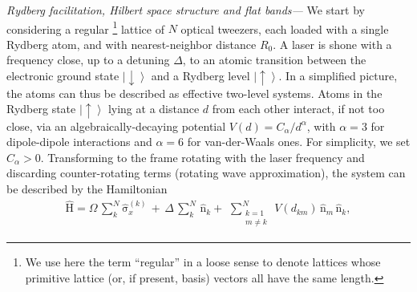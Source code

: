 \documentclass[prl,aps,twocolumn,showpacs,superscriptaddress,longbibliography]{revtex4-1}
\newcommand{\ran}{\right\rangle}
\newcommand{\ket}[1]{\left| #1 \ran}
\newcommand{\up}{\uparrow}
\newcommand{\down}{\downarrow}
\newcommand{\op}[1]{\mathrm{\hat{#1}}}
\begin{document}
\emph{Rydberg facilitation, Hilbert space structure and flat bands---} We start by considering a regular \footnote{We use here the term ``regular'' in a loose sense to denote lattices whose primitive lattice (or, if present, basis) vectors all have the same length.} lattice of $N$ optical tweezers, each loaded with a single Rydberg atom, and with nearest-neighbor distance $R_0$. A laser is shone with a frequency close, up to a detuning $\Delta$, to an atomic transition between the electronic ground state $\ket{\down}$ and a Rydberg level $\ket{\up}$. In a simplified picture, the atoms can thus be described as effective two-level systems. Atoms in the Rydberg state $\ket{\up}$ lying at a distance $d$ from each other interact, if not too close, via an algebraically-decaying potential $V(d) = C_\alpha / d^\alpha$, with $\alpha = 3$ for dipole-dipole interactions and $\alpha = 6$ for van-der-Waals ones. For simplicity, we set $C_\alpha > 0$. Transforming to the frame rotating with the laser frequency and discarding counter-rotating terms (rotating wave approximation), the system can be described by the Hamiltonian 
%
\begin{align}
 \op{H} = \Omega \, \sum_k^N  \op{\sigma}_x^{(k)} \, + \, \Delta\, \sum_k^N\,\op{n}_k +\,  \,
 \sum_{\substack{k= 1\\ m \ne k}}^N \, V(d_{km}) \, \op{n}_m\, \op{n}_k,
 \label{Eq:Hamil_full}
\end{align}
%
\end{document}
